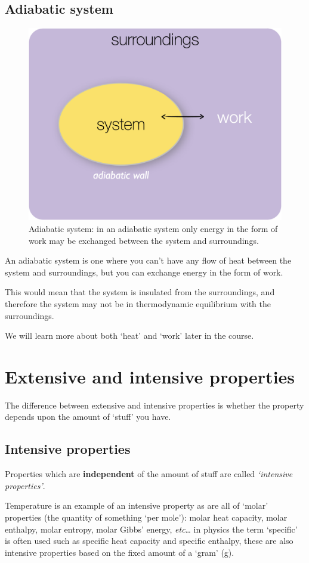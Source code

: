\documentclass[
]{book}
\begin{document}
\hypertarget{subsec:adiabatic}{%
\subsection{Adiabatic system}\label{subsec:adiabatic}}

\begin{figure}

{\centering \includegraphics[width=0.3\linewidth]{images/adiabatic} 

}

\caption{Adiabatic system: in an adiabatic system only energy in the form of work may be exchanged between the system and surroundings.}\label{fig:adiabatic}
\end{figure}

An adiabatic system is one where you can't have any flow of heat between the system and surroundings, but you can exchange energy in the form of work.

This would mean that the system is insulated from the surroundings, and therefore the system may not be in thermodynamic equilibrium with the surroundings.

We will learn more about both `heat' and `work' later in the course.

\hypertarget{sec:extensiveintensive}{%
\section{Extensive and intensive properties}\label{sec:extensiveintensive}}

The difference between extensive and intensive properties is whether the property depends upon the amount of `stuff' you have.

\hypertarget{sec:intenstive}{%
\subsection{Intensive properties}\label{sec:intenstive}}

Properties which are \textbf{independent} of the amount of stuff are called \emph{`intensive properties'}.

Temperature is an example of an intensive property as are all of `molar' properties (the quantity of something `per mole'): molar heat capacity, molar enthalpy, molar entropy, molar Gibbs' energy, \emph{etc}\ldots{} in physics the term `specific' is often used such as specific heat capacity and specific enthalpy, these are also intensive properties based on the fixed amount of a `gram' (g).
\end{document}
